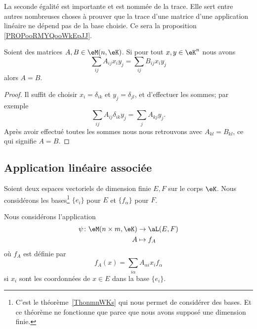 \begin{normaltext}
    La seconde égalité est importante et est nommée  de la trace. Elle sert entre autres nombreuses choses à prouver que la trace d'une matrice d'une application linéaire ne dépend pas de la base choisie. Ce sera la proposition \ref{PROPooRMYQooWkEpJJ}.
\end{normaltext}

\begin{lemma}       \label{LEMooLXAHooPRyHaF}
    Soient des matrices \( A,B\in \eM(n,\eK)\). Si pour tout \( x,y\in \eK^n\) nous avons
    \begin{equation}
        \sum_{ij}A_{ij}x_iy_j=\sum_{ij}B_{ij}x_iy_j
    \end{equation}
    alors \( A=B\).
\end{lemma}

\begin{proof}
    Il suffit de choisir \( x_i=\delta_{ik}\) et \( y_j=\delta_{jl}\), et d'effectuer les sommes; par exemple
    \begin{equation}
        \sum_{ij}A_{ij}\delta_{ik}y_j=\sum_jA_{kj}y_j.
    \end{equation}
    Après avoir effectué toutes les sommes nous nous retrouvons avec \( A_{kl}=B_{kl}\), ce qui signifie \( A=B\).
\end{proof}


\subsection{Application linéaire associée}

Soient deux espaces vectoriels de dimension finie \( E,F\) sur le corps \( \eK\). Nous considérons les bases\footnote{C'est le théorème~\ref{ThonmnWKs} qui nous permet de considérer des bases. Et ce théorème ne fonctionne que parce que nous avons supposé une dimension finie.} \( \{ e_i \}\) pour \( E\) et \( \{ f_{\alpha} \}\) pour \( F\). 

\begin{definition}      \label{DEFooJVOAooUgGKme}
    Nous considérons l'application
    \begin{equation}        \label{EQooVZQWooMyFFeO}
        \begin{aligned}
            \psi\colon \eM(n\times m, \eK)&\to \aL(E,F) \\
            A&\mapsto f_A 
        \end{aligned}
    \end{equation}
    où \( f_A\) est définie par
    \begin{equation}        \label{EQooBVGHooJhFbMs}
        f_A(x)=\sum_{i\alpha}A_{\alpha i}x_if_{\alpha}
    \end{equation}
    si \( x_i\) sont les coordonnées de \( x\in E\) dans la base \( \{ e_i \}\).
\end{definition}



